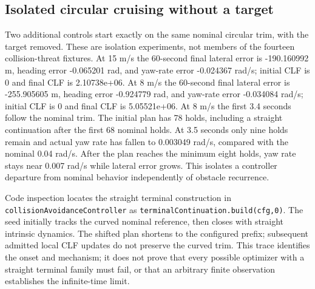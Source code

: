 \subsection{Isolated circular cruising without a target}
Two additional controls start exactly on the same nominal circular trim, with the target removed. These are isolation experiments, not members of the fourteen collision-threat fixtures.
At 15 m/s the 60-second final lateral error is -190.160992 m, heading error -0.065201 rad, and yaw-rate error -0.024367 rad/s; initial CLF is 0 and final CLF is 2.10738e+06.
At 8 m/s the 60-second final lateral error is -255.905605 m, heading error -0.924779 rad, and yaw-rate error -0.034084 rad/s; initial CLF is 0 and final CLF is 5.05521e+06.
At 8 m/s the first 3.4 seconds follow the nominal trim. The initial plan has 78 holds, including a straight continuation after the first 68 nominal holds. At 3.5 seconds only nine holds remain and actual yaw rate has fallen to 0.003049 rad/s, compared with the nominal 0.04 rad/s. After the plan reaches the minimum eight holds, yaw rate stays near 0.007 rad/s while lateral error grows. This isolates a controller departure from nominal behavior independently of obstacle recurrence.

Code inspection locates the straight terminal construction in \texttt{collisionAvoidanceController} as \texttt{terminalContinuation.build(cfg,0)}. The seed initially tracks the curved nominal reference, then closes with straight intrinsic dynamics. The shifted plan shortens to the configured prefix; subsequent admitted local CLF updates do not preserve the curved trim. This trace identifies the onset and mechanism; it does not prove that every possible optimizer with a straight terminal family must fail, or that an arbitrary finite observation establishes the infinite-time limit.
